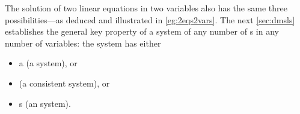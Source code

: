 The solution of two linear equations in two variables also has the same three possibilities---as deduced and illustrated in \cref{eg:2eqs2vars}.
The next \cref{sec:dmsls} establishes the general key property of a system of any number of s in any number of variables: the system has either
\begin{itemize}
\item a  (a  system), or
\item {} (a consistent system), or
\item {}s (an  system).
\end{itemize}








\sectionExercises


